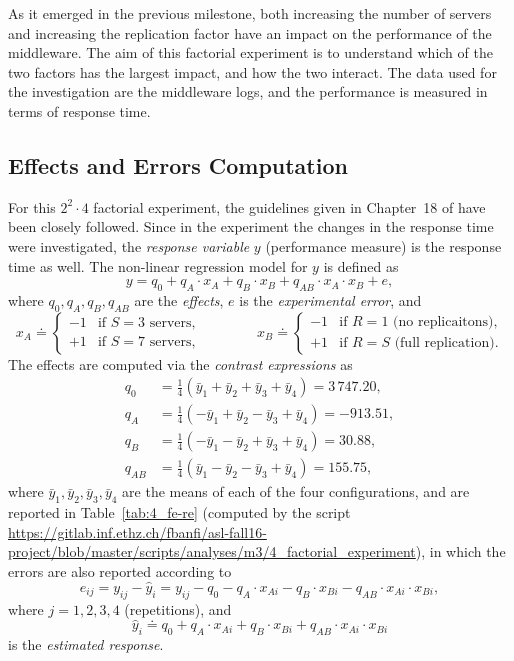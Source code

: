 \documentclass[11pt]{article}
\theoremstyle{definition}
\newcommand\df\doteq
\begin{document}
As it emerged in the previous milestone, both increasing the number of servers and increasing the replication factor have an impact on the performance of the middleware.
The aim of this factorial experiment is to understand which of the two factors has the largest impact, and how the two interact.
The data used for the investigation are the middleware logs, and the performance is measured in terms of response time.

\subsection{Effects and Errors Computation}

For this $2^2\cdot4$ factorial experiment, the guidelines given in Chapter~18 of \cite{jain91} have been closely followed.
Since in the experiment the changes in the response time were investigated, the \emph{response variable} $y$ (performance measure) is the response time as well.
The non-linear regression model for $y$ is defined as
\[y=q_0+q_A\cdot x_A+q_B\cdot x_B+q_{AB}\cdot x_A\cdot x_B+e,\]
where $q_0,q_A,q_B,q_{AB}$ are the \emph{effects}, $e$ is the \emph{experimental error}, and
\[
    x_A\df\begin{cases}-1&\text{if $S=3$ servers,}\\+1&\text{if $S=7$ servers,}\end{cases}\qquad\qquad
    x_B\df\begin{cases}-1&\text{if $R=1$ (no replicaitons),}\\+1&\text{if $R=S$ (full replication).}\end{cases}
\]
The effects are computed via the \emph{contrast expressions} as
\begin{align*}   
    q_0&=\frac14(\bar y_1+\bar y_2+\bar y_3+\bar y_4)=3\,747.20,\\
    q_A&=\frac14(-\bar y_1+\bar y_2-\bar y_3+\bar y_4)=-913.51,\\
    q_B&=\frac14(-\bar y_1-\bar y_2+\bar y_3+\bar y_4)=30.88,\\
    q_{AB}&=\frac14(\bar y_1-\bar y_2-\bar y_3+\bar y_4)=155.75,
\end{align*}
where $\bar y_1,\bar y_2,\bar y_3,\bar y_4$ are the means of each of the four configurations, and are reported in Table~\ref{tab:4_fe-re} (computed by the script \url{https://gitlab.inf.ethz.ch/fbanfi/asl-fall16-project/blob/master/scripts/analyses/m3/4_factorial_experiment}), in which the errors are also reported according to
\[e_{ij}=y_{ij}-\hat y_i=y_{ij}-q_0-q_A\cdot x_{Ai}-q_B\cdot x_{Bi}-q_{AB}\cdot x_{Ai}\cdot x_{Bi},\]
where $j=1,2,3,4$ (repetitions), and
\[\hat y_i\df q_0+q_A\cdot x_{Ai}+q_B\cdot x_{Bi}+q_{AB}\cdot x_{Ai}\cdot x_{Bi}\]
is the \emph{estimated response}.
\end{document}
